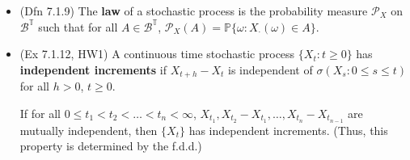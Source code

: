\documentclass[twoside]{article}
\newcommand\bbP{\mathbb{P}}
\newcommand\bbT{\mathbb{T}}
\newcommand\calB{\mathcal{B}}
\newcommand\calP{\mathcal{P}}
\newcommand\om{\omega}
\newcommand\sg{\sigma}
\begin{document}
\begin{itemize}
\item (Dfn 7.1.9) The \textbf{law} of a stochastic process is the probability measure $\calP_X$ on $\calB^\bbT$ such that for all $A \in \calB^\bbT$, $\calP_X (A) = \bbP \{ \om: X_\cdot (\om) \in A \}$.

\item (Ex 7.1.12, HW1) A continuous time stochastic process $\{X_t: t\geq0\}$ has \textbf{independent increments} if $X_{t+h} - X_t$ is independent of $\sg(X_s: 0 \leq s \leq t)$ for all $h > 0$, $t \geq 0$.

If for all $0 \leq t_1 < t_2 < \dots < t_n < \infty$, $X_{t_1}, X_{t_2} - X_{t_1}, \dots, X_{t_n} - X_{t_{n-1}}$ are mutually independent, then $\{X_t\}$ has independent increments. (Thus, this property is determined by the f.d.d.)
\end{itemize}
\end{document}
